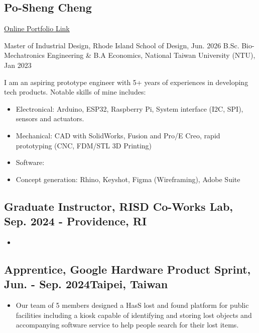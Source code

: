 \documentclass[12pt]{article}
\begin{document}
\begin{multicols}{2}
    \section*{Po-Sheng Cheng}
    \href{https://bencer3283.github.io/art/}{\underline{Online Portfolio Link}}
    
    \columnbreak
    {\sffamily \small \noindent
    Master of Industrial Design, Rhode Island School of Design, Jun. 2026 \newline
    B.Sc. Bio-Mechatronics Engineering \& \newline B.A Economics, National Taiwan University (NTU), Jan 2023
    }
\end{multicols}
{\small I am an aspiring prototype engineer with 5+ years of experiences in developing tech products. Notable skills of mine includes:
\begin{itemize}
    \item Electronical: Arduino, ESP32, Raspberry Pi, System interface (I2C, SPI), sensors and actuators.
    \item Mechanical: CAD with SolidWorks, Fusion and Pro/E Creo, rapid prototyping (CNC, FDM/STL 3D Printing)
    \item Software: 
    \item Concept generation: Rhino, Keyshot, Figma (Wireframing), Adobe Suite
\end{itemize}}
    \subsection*{Graduate Instructor, RISD Co-Works Lab, Sep. 2024 -  \hfill Providence, RI}
        {\sffamily
        \begin{itemize}
            \item 
        \end{itemize}
        }
    \subsection*{Apprentice, Google Hardware Product Sprint, Jun. - Sep. 2024\hfill Taipei, Taiwan}
        {\sffamily \small
        \begin{itemize}
            \item Our team of 5 members designed a HasS lost and found platform for public facilities including a kiosk capable of identifying and storing lost objects and accompanying software service to help people search for their lost items.
        \end{itemize}
        }
\end{document}

